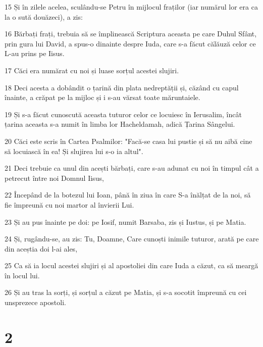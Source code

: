 \par 15 Și în zilele acelea, sculându-se Petru în mijlocul fraților (iar numărul lor era ca la o sută douăzeci), a zis:
\par 16 Bărbați frați, trebuia să se împlinească Scriptura aceasta pe care Duhul Sfânt, prin gura lui David, a spus-o dinainte despre Iuda, care s-a făcut călăuză celor ce L-au prins pe Iisus.
\par 17 Căci era numărat cu noi și luase sorțul acestei slujiri.
\par 18 Deci acesta a dobândit o țarină din plata nedreptății și, căzând cu capul înainte, a crăpat pe la mijloc și i s-au vărsat toate măruntaiele.
\par 19 Și s-a făcut cunoscută aceasta tuturor celor ce locuiesc în Ierusalim, încât țarina aceasta s-a numit în limba lor Hacheldamah, adică Țarina Sângelui.
\par 20 Căci este scris în Cartea Psalmilor: "Facă-se casa lui pustie și să nu aibă cine să locuiască în ea! Și slujirea lui s-o ia altul".
\par 21 Deci trebuie ca unul din acești bărbați, care s-au adunat cu noi în timpul cât a petrecut între noi Domnul Iisus,
\par 22 Începând de la botezul lui Ioan, până în ziua în care S-a înălțat de la noi, să fie împreună cu noi martor al învierii Lui.
\par 23 Și au pus înainte pe doi: pe Iosif, numit Barsaba, zis și Iustus, și pe Matia.
\par 24 Și, rugându-se, au zis: Tu, Doamne, Care cunoști inimile tuturor, arată pe care din aceștia doi l-ai ales,
\par 25 Ca să ia locul acestei slujiri și al apostoliei din care Iuda a căzut, ca să meargă în locul lui.
\par 26 Și au tras la sorți, și sorțul a căzut pe Matia, și s-a socotit împreună cu cei unsprezece apostoli.

\chapter{2}

